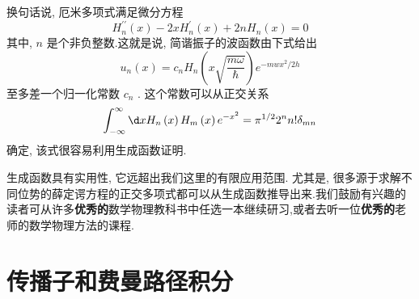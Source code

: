 \documentclass[lang=cn,newtx,10pt,scheme=chinese,thmcnt=section]{elegantbook}
\begin{document}
换句话说, 厄米多项式满足微分方程
\begin{equation}
	{H}_{n}^{\prime \prime }\left( x\right) - {2x}{H}_{n}^{\prime }\left( x\right) + {2n}{H}_{n}\left( x\right) = 0
\end{equation}
其中, $n$ 是个非负整数.这就是说, 简谐振子的波函数由下式给出
\begin{equation}
	{u}_{n}\left( x\right) = {c}_{n}{H}_{n}\left( {x\sqrt{\frac{m\omega }{\hbar }}}\right) {e}^{-{mw}{x}^{2}/{2h}}
\end{equation}
至多差一个归一化常数 ${c}_{n}$ . 这个常数可以从正交关系
\begin{equation}
	\int_{-\infty }^{\infty }{\d x}{H}_{n}\left( x\right) {H}_{m}\left( x\right) {e}^{-{x}^{2}} = {\pi }^{1/2}{2}^{n}n!{\delta }_{mn}
\end{equation}
确定, 该式很容易利用生成函数证明.

生成函数具有实用性, 它远超出我们这里的有限应用范围. 尤其是, 很多源于求解不同位势的薛定谔方程的正交多项式都可以从生成函数推导出来.我们鼓励有兴趣的读者可从许多\textbf{优秀的}数学物理教科书中任选一本继续研习,或者去听一位\textbf{优秀的}老师的数学物理方法的课程.

\section{传播子和费曼路径积分}
\end{document}

